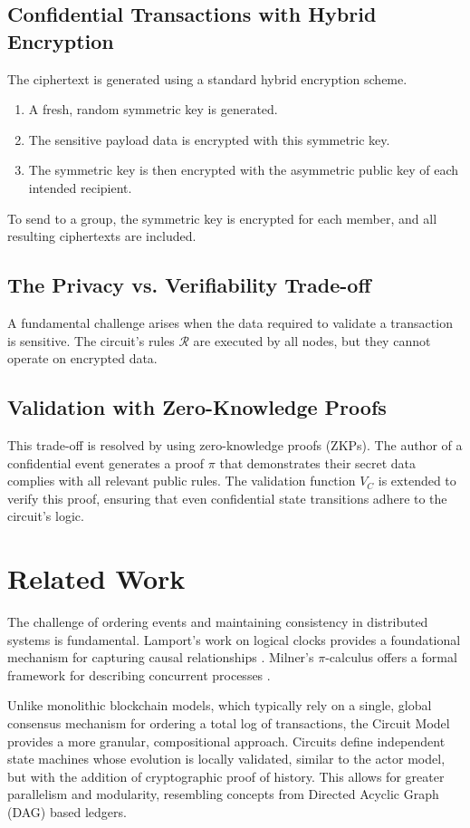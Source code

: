 \documentclass{article}
\begin{document}
\subsection{Confidential Transactions with Hybrid Encryption}
The ciphertext is generated using a standard hybrid encryption scheme.
\begin{enumerate}
    \item A fresh, random symmetric key is generated.    \item The sensitive payload data is encrypted with this symmetric key.    \item The symmetric key is then encrypted with the asymmetric public key of each intended recipient.
\end{enumerate}
To send to a group, the symmetric key is encrypted for each member, and all resulting ciphertexts are included.

\subsection{The Privacy vs. Verifiability Trade-off}
A fundamental challenge arises when the data required to validate a transaction is sensitive. The circuit's rules $\mathcal{R}$ are executed by all nodes, but they cannot operate on encrypted data. 

\subsection{Validation with Zero-Knowledge Proofs}
This trade-off is resolved by using zero-knowledge proofs (ZKPs). The author of a confidential event generates a proof $\pi$ that demonstrates their secret data complies with all relevant public rules. The validation function $V_C$ is extended to verify this proof, ensuring that even confidential state transitions adhere to the circuit's logic.

\section{Related Work}

The challenge of ordering events and maintaining consistency in distributed systems is fundamental. Lamport's work on logical clocks provides a foundational mechanism for capturing causal relationships \cite{lamport1978}. Milner's $\pi$-calculus offers a formal framework for describing concurrent processes \cite{milner1999}. 

Unlike monolithic blockchain models, which typically rely on a single, global consensus mechanism for ordering a total log of transactions, the Circuit Model provides a more granular, compositional approach. Circuits define independent state machines whose evolution is locally validated, similar to the actor model, but with the addition of cryptographic proof of history. This allows for greater parallelism and modularity, resembling concepts from Directed Acyclic Graph (DAG) based ledgers.
\end{document}
